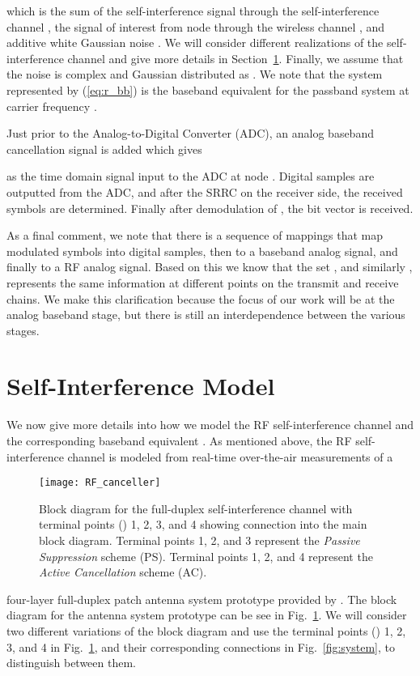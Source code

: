 \documentclass[12pt, journal,draftcls,letterpaper,onecolumn]{IEEEtran}
\begin{document}
which is the sum of the self-interference signal  through the self-interference channel , the signal of interest  from node  through the wireless channel , and additive white Gaussian noise .  We will consider different realizations of the self-interference channel  and give more details in Section~\ref{sec:self_int_model}.  Finally, we assume that the noise is complex and Gaussian distributed as .  We note that the system represented by (\ref{eq:r_bb}) is the baseband equivalent for the passband system at carrier frequency .

Just prior to the Analog-to-Digital Converter (ADC), an analog baseband cancellation signal is added which gives 

as the time domain signal input to the ADC at node .  Digital samples  are outputted from the ADC, and after the SRRC on the receiver side, the received symbols  are determined.  Finally after demodulation of , the  bit vector  is received.  

As a final comment, we note that there is 
a sequence of mappings that map modulated symbols into digital samples, then to a baseband analog signal, and finally to a RF analog signal.  Based on this we know that the set , and similarly , represents the same information at different points on the transmit and receive chains.  We make this clarification because the focus of our work will be at the analog baseband stage, but there is still an interdependence between the various stages.   

\section{Self-Interference Model}
\label{sec:self_int_model}
We now give more details into how we model the RF self-interference channel  and the corresponding baseband equivalent .  As mentioned above, the RF self-interference channel is modeled from real-time over-the-air measurements of a 
\begin{figure}[htp]
\begin{center} 
  \texttt{[image: RF\_canceller]}
\caption[fig:system]{Block diagram for the full-duplex self-interference channel  with terminal points () 1, 2, 3, and 4 showing connection into the main block diagram.  Terminal points 1, 2, and 3 represent the \emph{Passive Suppression} scheme (PS).  Terminal points 1, 2, and 4 represent the \emph{Active Cancellation} scheme (AC).}
  \label{fig:RF_canceller}
\end{center} 
\end{figure} 
four-layer full-duplex patch antenna system prototype provided by \cite{RISC_WEB}. 
The block diagram for the antenna system prototype can be see in Fig.~\ref{fig:RF_canceller}.  We will consider two different variations of the block diagram and use the terminal points () 1, 2, 3, and 4 in Fig.~\ref{fig:RF_canceller}, and their corresponding connections in Fig.~\ref{fig:system}, to distinguish between them.  
 
\end{document}

